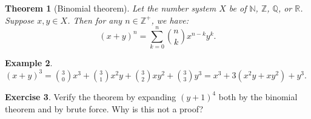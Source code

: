 \documentclass[a4paper]{amsart}
\newtheorem{thm}{Theorem}[section]
\theoremstyle{definition}
\newtheorem{ex}[thm]{Example}
\newtheorem{exercise}[thm]{Exercise}
\theoremstyle{remark}
\begin{document}
\begin{thm}[Binomial theorem]
  Let the number system $ X $ be of $ \mathbb{N} $, $ \mathbb{Z} $, $ \mathbb{Q} $, or $ \mathbb{R} $. Suppose $ x, y \in X $. Then
  for any $ n \in \mathbb{Z}^+ $, we have:
  \begin{displaymath}
    (x + y)^n = \sum_{k = 0}^n \binom{n}{k} x^{n - k} y^k.
  \end{displaymath}
\end{thm}

\begin{ex}
  $ (x + y)^3 = \binom{3}{0} x^3 + \binom{3}{1} x^2 y + \binom{3}{2} x y^2 + \binom{3}{3} y^3 = x^3 + 3(x^2 y + xy^2) + y^3 $.
\end{ex}

\begin{exercise}
  Verify the theorem by expanding $ (y + 1)^4 $ both by the binomial theorem and by brute force. Why is this not a proof?
\end{exercise}
\end{document}
